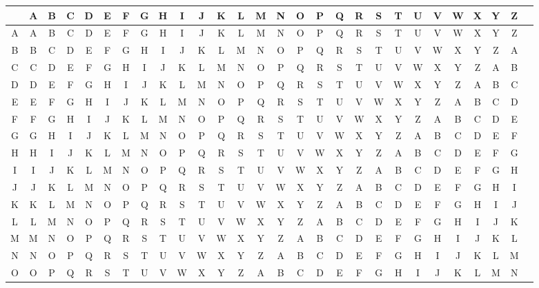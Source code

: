 \documentclass[12pt]{article}
\begin{document}
\begin{figure}[ht]
\begin{adjustbox}{max width=\textwidth}
	\begin{tabular}{| c || c | c | c | c | c | c | c | c | c | c | c | c | c | c | c | c | c | c | c | c | c | c | c | c | c | c | c ||}
		\hline
		 & A & B & C & D & E & F & G & H & I & J & K & L & M & N & O & P & Q & R & S & T & U & V & W & X & Y & Z \\
		\hline\hline
A & A & B & C & D & E & F & G & H & I & J & K & L & M & N & O & P & Q & R & S & T & U & V & W & X & Y & Z \\ \hline
B & B & C & D & E & F & G & H & I & J & K & L & M & N & O & P & Q & R & S & T & U & V & W & X & Y & Z & A \\ \hline
C & C & D & E & F & G & H & I & J & K & L & M & N & O & P & Q & R & S & T & U & V & W & X & Y & Z & A & B \\ \hline
D & D & E & F & G & H & I & J & K & L & M & N & O & P & Q & R & S & T & U & V & W & X & Y & Z & A & B & C \\ \hline
E & E & F & G & H & I & J & K & L & M & N & O & P & Q & R & S & T & U & V & W & X & Y & Z & A & B & C & D \\ \hline
F & F & G & H & I & J & K & L & M & N & O & P & Q & R & S & T & U & V & W & X & Y & Z & A & B & C & D & E \\ \hline
G & G & H & I & J & K & L & M & N & O & P & Q & R & S & T & U & V & W & X & Y & Z & A & B & C & D & E & F \\ \hline
H & H & I & J & K & L & M & N & O & P & Q & R & S & T & U & V & W & X & Y & Z & A & B & C & D & E & F & G \\ \hline
I & I & J & K & L & M & N & O & P & Q & R & S & T & U & V & W & X & Y & Z & A & B & C & D & E & F & G & H \\ \hline
J & J & K & L & M & N & O & P & Q & R & S & T & U & V & W & X & Y & Z & A & B & C & D & E & F & G & H & I \\ \hline
K & K & L & M & N & O & P & Q & R & S & T & U & V & W & X & Y & Z & A & B & C & D & E & F & G & H & I & J \\ \hline
L & L & M & N & O & P & Q & R & S & T & U & V & W & X & Y & Z & A & B & C & D & E & F & G & H & I & J & K \\ \hline
M & M & N & O & P & Q & R & S & T & U & V & W & X & Y & Z & A & B & C & D & E & F & G & H & I & J & K & L \\ \hline
N & N & O & P & Q & R & S & T & U & V & W & X & Y & Z & A & B & C & D & E & F & G & H & I & J & K & L & M \\ \hline
O & O & P & Q & R & S & T & U & V & W & X & Y & Z & A & B & C & D & E & F & G & H & I & J & K & L & M & N \\ \hline

\end{tabular}
\end{adjustbox}
\end{figure}
\end{document}
